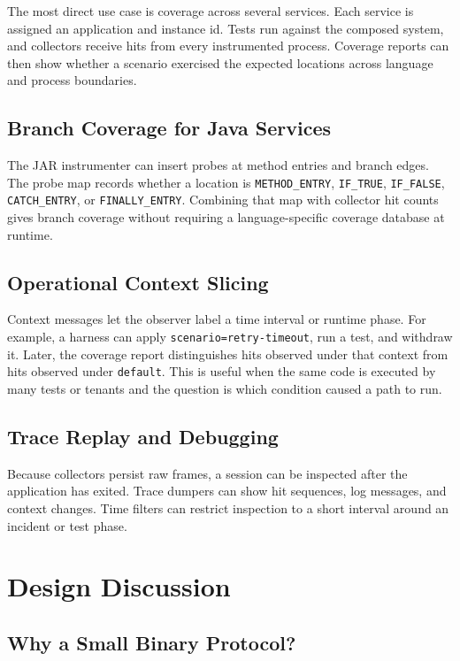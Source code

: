 \documentclass[11pt]{article}
\newcommand{\code}[1]{\texttt{#1}}
\begin{document}
The most direct use case is coverage across several services. Each service is
assigned an application and instance id. Tests run against the composed system,
and collectors receive hits from every instrumented process. Coverage reports
can then show whether a scenario exercised the expected locations across
language and process boundaries.

\subsection{Branch Coverage for Java Services}

The JAR instrumenter can insert probes at method entries and branch edges. The
probe map records whether a location is \code{METHOD\_ENTRY}, \code{IF\_TRUE},
\code{IF\_FALSE}, \code{CATCH\_ENTRY}, or \code{FINALLY\_ENTRY}. Combining that
map with collector hit counts gives branch coverage without requiring a
language-specific coverage database at runtime.

\subsection{Operational Context Slicing}

Context messages let the observer label a time interval or runtime phase. For
example, a harness can apply \code{scenario=retry-timeout}, run a test, and
withdraw it. Later, the coverage report distinguishes hits observed under that
context from hits observed under \code{default}. This is useful when the same
code is executed by many tests or tenants and the question is which condition
caused a path to run.

\subsection{Trace Replay and Debugging}

Because collectors persist raw frames, a session can be inspected after the
application has exited. Trace dumpers can show hit sequences, log messages, and
context changes. Time filters can restrict inspection to a short interval
around an incident or test phase.

\section{Design Discussion}

\subsection{Why a Small Binary Protocol?}
\end{document}
